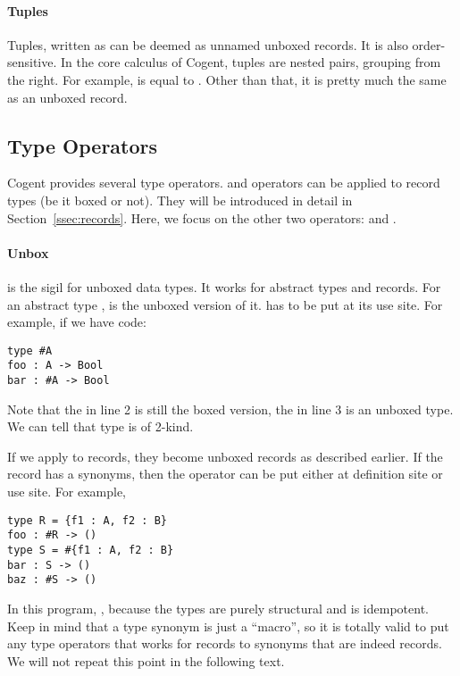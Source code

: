 \documentclass[a4paper]{article}
\newcommand{\cogent}{Cogent\xspace}
\begin{document}
\paragraph{Tuples} Tuples, written as  can be deemed as unnamed unboxed records. It is also order-sensitive. 
In the core calculus of \cogent, tuples are nested pairs, grouping from the right. For example,  is equal to
. Other than that, it is pretty much the same as an unboxed record.

\subsection{Type Operators}
\cogent provides several type operators.  and  operators can be applied to
record types (be it boxed or not). They will be introduced in detail in Section~\ref{ssec:records}.
Here, we focus on the other two operators: \code{\#} and \code{!}.

\paragraph{Unbox} \code{\#} is the sigil for unboxed data types. It works for
abstract types and records. For an abstract type ,  
is the unboxed version of it. \code{\#} has to be put at its use site.
For example, if we have code:
\begin{lstlisting}[language=Cogent]
type #A
foo : A -> Bool
bar : #A -> Bool
\end{lstlisting}
Note that the  in line 2 is still the boxed version, the  in
line 3 is an unboxed type. We can tell that type  is of 2-kind.

If we apply \code{\#} to records, they become unboxed records as described earlier. 
If the record has a synonyms, then the operator can be put either at definition site
or use site. For example,
\begin{lstlisting}[language=Cogent]
type R = {f1 : A, f2 : B}
foo : #R -> ()
type S = #{f1 : A, f2 : B}
bar : S -> ()
baz : #S -> ()
\end{lstlisting}
In this program, , because the types are purely structural and
\code{\#} is idempotent. Keep in mind that a type synonym is just a ``macro'',
so it is totally valid to put any type operators that works for records to
synonyms that are indeed records. We will not repeat this point in the following text.
\end{document}
